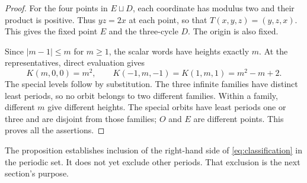 \begin{proof}
For the four points in $E\sqcup D$, each coordinate has modulus two
and their product is positive. Thus $yz=2x$ at each point, so that
$T(x,y,z)=(y,z,x)$. This gives the fixed point $E$ and the
three-cycle $D$. The origin is also fixed.

Since $|m-1|\leq m$ for $m\geq1$, the scalar words have heights
exactly $m$. At the representatives, direct evaluation gives
\begin{equation}\label{eq:family-levels}
 K(m,0,0)=m^2,\qquad
 K(-1,m,-1)=K(1,m,1)=m^2-m+2.
\end{equation}
The special levels follow by substitution. The three infinite families
have distinct least periods, so no orbit belongs to two different
families. Within a family, different $m$ give different heights.
The special orbits have least periods one or three and are disjoint
from those families; $O$ and $E$ are different points. This proves
all the assertions.
\end{proof}

The proposition establishes inclusion of the right-hand side of
\eqref{eq:classification} in the periodic set. It does not yet
exclude other periods. That exclusion is the next section's purpose.
